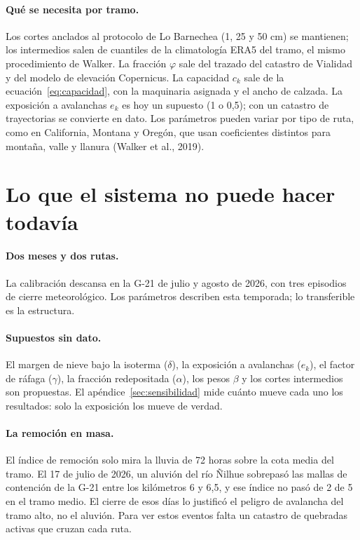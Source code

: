 \documentclass[11pt,a4paper]{article}
\begin{document}
\paragraph{Qué se necesita por tramo.} Los cortes anclados al protocolo de Lo Barnechea (1, 25 y 50 cm) se mantienen; los intermedios salen de cuantiles de la climatología ERA5 del tramo, el mismo procedimiento de Walker. La fracción $\varphi$ sale del trazado del catastro de Vialidad y del modelo de elevación Copernicus. La capacidad $c_k$ sale de la ecuación~\eqref{eq:capacidad}, con la maquinaria asignada y el ancho de calzada. La exposición a avalanchas $e_k$ es hoy un supuesto (1 o 0,5); con un catastro de trayectorias se convierte en dato. Los parámetros pueden variar por tipo de ruta, como en California, Montana y Oregón, que usan coeficientes distintos para montaña, valle y llanura (Walker et al., 2019).

\section{Lo que el sistema no puede hacer todavía}\label{sec:limites}

\paragraph{Dos meses y dos rutas.} La calibración descansa en la G-21 de julio y agosto de 2026, con tres episodios de cierre meteorológico. Los parámetros describen esta temporada; lo transferible es la estructura.

\paragraph{Supuestos sin dato.} El margen de nieve bajo la isoterma ($\delta$), la exposición a avalanchas ($e_k$), el factor de ráfaga ($\gamma$), la fracción redepositada ($\alpha$), los pesos $\beta$ y los cortes intermedios son propuestas. El apéndice~\ref{sec:sensibilidad} mide cuánto mueve cada uno los resultados: solo la exposición los mueve de verdad.

\paragraph{La remoción en masa.} El índice de remoción solo mira la lluvia de 72 horas sobre la cota media del tramo. El 17 de julio de 2026, un aluvión del río Ñilhue sobrepasó las mallas de contención de la G-21 entre los kilómetros 6 y 6,5, y ese índice no pasó de 2 de 5 en el tramo medio. El cierre de esos días lo justificó el peligro de avalancha del tramo alto, no el aluvión. Para ver estos eventos falta un catastro de quebradas activas que cruzan cada ruta.
\end{document}
